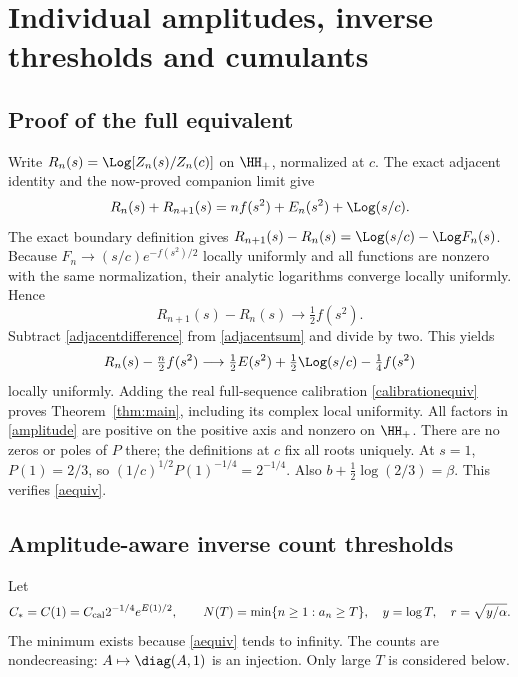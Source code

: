 \section{Individual amplitudes, inverse thresholds and cumulants}\label{sec:consequences}
\subsection{Proof of the full equivalent}
Write $R_n(s)=\Log[Z_n(s)/Z_n(c)]$ on $\HH_+$, normalized at $c$.
The exact adjacent identity and the now-proved companion limit give
\begin{equation}\label{adjacentsum}
 R_n(s)+R_{n+1}(s)=nf(s^2)+E_n(s^2)+\Log(s/c).
\end{equation}
The exact boundary definition gives
$R_{n+1}(s)-R_n(s)=\Log(s/c)-\Log F_n(s)$.
Because $F_n\to(s/c)e^{-f(s^2)/2}$ locally uniformly and all functions
are nonzero with the same normalization, their analytic logarithms
converge locally uniformly. Hence
\begin{equation}\label{adjacentdifference}
 R_{n+1}(s)-R_n(s)\longrightarrow\tfrac12f(s^2).
\end{equation}
Subtract \eqref{adjacentdifference} from \eqref{adjacentsum} and divide
by two. This yields
\begin{equation}\label{Rlimit}
 R_n(s)-\tfrac n2f(s^2)
 \longrightarrow\tfrac12E(s^2)+\tfrac12\Log(s/c)-\tfrac14f(s^2)
\end{equation}
locally uniformly. Adding the real full-sequence calibration
\eqref{calibrationequiv} proves Theorem~\ref{thm:main}, including its
complex local uniformity. All factors in \eqref{amplitude} are positive
on the positive axis and nonzero on $\HH_+$. There are no zeros or
poles of $P$ there; the definitions at $c$ fix all roots uniquely.
At $s=1$, $P(1)=2/3$, so
$(1/c)^{1/2}P(1)^{-1/4}=2^{-1/4}$. Also
$b+\tfrac12\log(2/3)=\beta$. This verifies \eqref{aequiv}.

\subsection{Amplitude-aware inverse count thresholds}
Let
\[
 C_*=C(1)=C_{\rm cal}2^{-1/4}e^{E(1)/2},\qquad
 N(T)=\min\{n\ge1:a_n\ge T\},\quad y=\log T,\quad r=\sqrt{y/\alpha}.
\]
The minimum exists because \eqref{aequiv} tends to infinity.
The counts are nondecreasing: $A\mapsto\diag(A,1)$ is an injection.
Only large $T$ is considered below.


